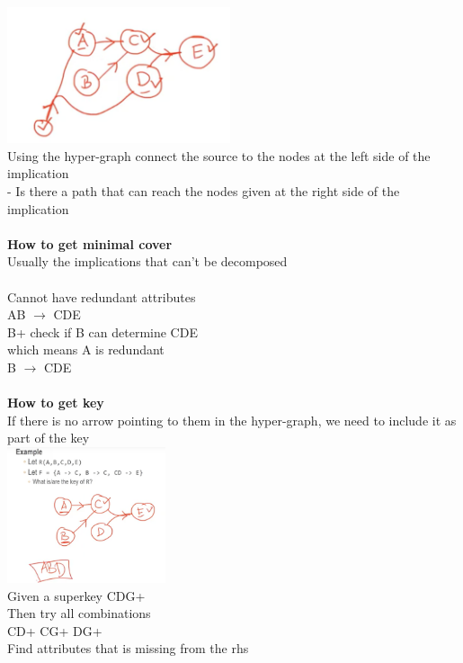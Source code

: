 \documentclass[11pt]{article}
\begin{document}
\includegraphics[height=4cm]{images/ss}
\\
Using the hyper-graph connect the source to the nodes at the left side of the implication\\
- Is there a path that can reach the nodes given at the right side of the implication
\\\\
\textbf{How to get minimal cover}\\
Usually the implications that can't be decomposed\\\\
Cannot have redundant attributes\\
AB $\rightarrow$ CDE\\
B+ check if B can determine CDE\\
which means A is redundant\\
B $\rightarrow$ CDE
\\\\
\textbf{How to get key}\\
If there is no arrow pointing to them in the hyper-graph, we need to include it as part of the key\\
\includegraphics[height=4cm]{images/sss}
\\
Given a superkey
CDG+\\
Then try all combinations\\
CD+ CG+ DG+\\
Find attributes that is missing from the rhs
\end{document}
